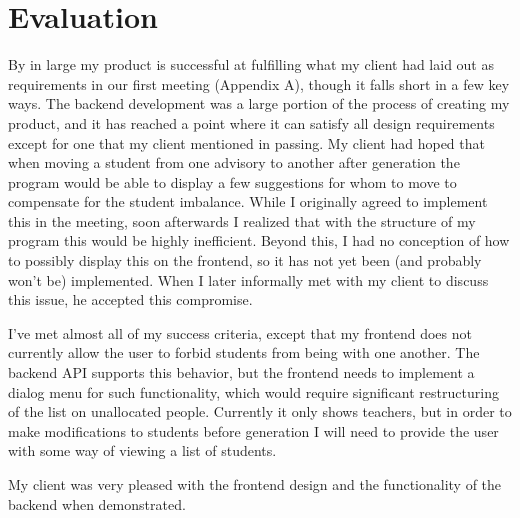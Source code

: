 \documentclass[advisory-ia.tex]{subfiles}
\begin{document}
\section{Evaluation}
\label{sec:eval}
By in large my product is successful at fulfilling what my client had laid out as requirements in our first meeting (Appendix A), though it falls short in a few key ways.
The backend development was a large portion of the process of creating my product, and it has reached a point where it can satisfy all design requirements except for one that my client mentioned in passing.
My client had hoped that when moving a student from one advisory to another after generation the program would be able to display a few suggestions for whom to move to compensate for the student imbalance.
While I originally agreed to implement this in the meeting, soon afterwards I realized that with the structure of my program this would be highly inefficient.
Beyond this, I had no conception of how to possibly display this on the frontend, so it has not yet been (and probably won't be) implemented.
When I later informally met with my client to discuss this issue, he accepted this compromise.

I've met almost all of my success criteria, except that my frontend does not currently allow the user to forbid students from being with one another.
The backend API supports this behavior, but the frontend needs to implement a dialog menu for such functionality, which would require significant restructuring of the list on unallocated people.
Currently it only shows teachers, but in order to make modifications to students before generation I will need to provide the user with some way of viewing a list of students.

My client was very pleased with the frontend design and the functionality of the backend when demonstrated.
\end{document}
